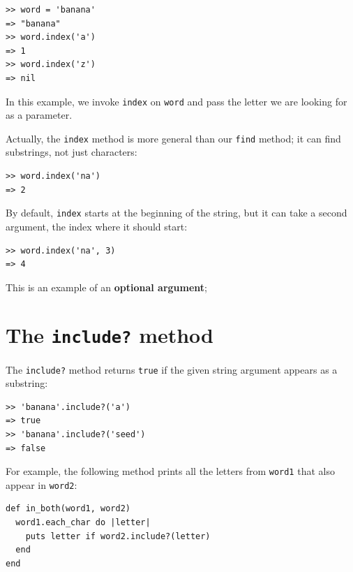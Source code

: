 \documentclass[10pt]{book}
\begin{document}
\begin{verbatim}
>> word = 'banana'
=> "banana"
>> word.index('a')
=> 1
>> word.index('z')
=> nil
\end{verbatim}
%
In this example, we invoke {\tt index} on {\tt word} and pass
the letter we are looking for as a parameter.

Actually, the {\tt index} method is more general than our {\tt find} method;
it can find substrings, not just characters:

\begin{verbatim}
>> word.index('na')
=> 2
\end{verbatim}
%
By default, {\tt index} starts at the beginning of the string, but
it can take a second argument, the index where it should start:

\begin{verbatim}
>> word.index('na', 3)
=> 4
\end{verbatim}
%
This is an example of an {\bf optional argument};



\section{The {\tt include?} method}

The {\tt include?} method
returns {\tt true} if the given string argument appears as a substring:

\begin{verbatim}
>> 'banana'.include?('a')
=> true
>> 'banana'.include?('seed')
=> false
\end{verbatim}
%
For example, the following method prints all the
letters from {\tt word1} that also appear in {\tt word2}:

\begin{verbatim}
def in_both(word1, word2)
  word1.each_char do |letter|
    puts letter if word2.include?(letter)
  end
end
\end{verbatim}
%
\end{document}
